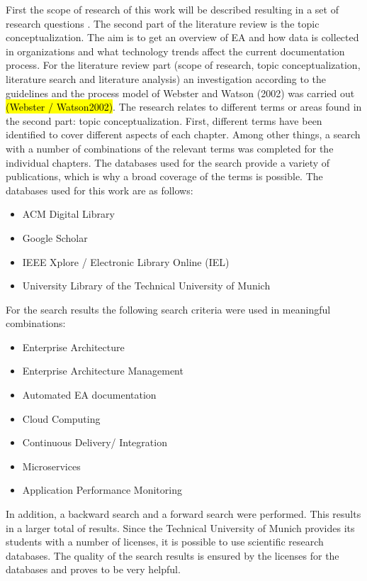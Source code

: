 First the scope of research of this work will be described resulting in a set of research questions . The second part of the literature review is the topic conceptualization. The aim is to get an overview of EA and how data is collected in organizations and what technology trends affect the current documentation process. 
For the literature review part (scope of research, topic conceptualization, literature search and literature analysis)  an investigation according to the guidelines and the process model of Webster and Watson (2002) was carried out \hl{(Webster / Watson2002)}. The research relates to different terms or areas found in the second part: topic conceptualization. First, different terms have been identified to cover different aspects of each chapter. Among other things, a search with a number of combinations of the relevant terms was completed for the individual chapters.
The databases used for the search provide a variety of publications, which is why a broad coverage of the terms is possible. The databases used for this work are as follows:

\begin{itemize}
    \item ACM Digital Library
    \item Google Scholar
    \item IEEE Xplore / Electronic Library Online (IEL)
    \item University Library of the Technical University of Munich
\end{itemize}

For the search results the following search criteria were used in meaningful combinations:

\begin{itemize}
    \item Enterprise Architecture
    \item Enterprise Architecture Management
    \item Automated EA documentation
    \item Cloud Computing
    \item Continuous Delivery/ Integration
    \item Microservices
    \item Application Performance Monitoring
\end{itemize}

In addition, a backward search and a forward search were performed. This results in a larger total of results. Since the Technical University of Munich provides its students with a number of licenses, it is possible to use scientific research databases. The quality of the search results is ensured by the licenses for the databases and proves to be very helpful.


